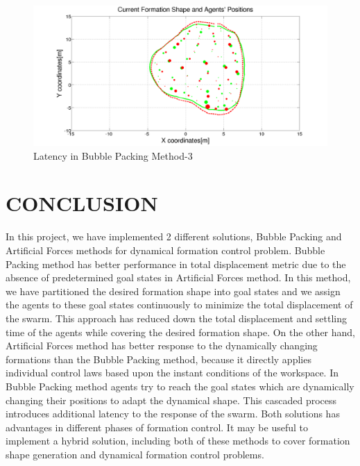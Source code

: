 \documentclass[letterpaper, 10 pt, conference]{ieeeconf}  %
\begin{document}
\begin{figure}[thpb]
\caption{Latency in Bubble Packing Method-3} \label{combo3_ref}
\centerline{\includegraphics[scale = 0.15]{combo3}}
\end{figure}

\section{CONCLUSION}
In this project, we have implemented 2 different solutions, Bubble Packing and Artificial Forces methods for dynamical formation control problem. Bubble Packing method has better performance in total displacement metric due to the absence of predetermined goal states in Artificial Forces method. In this method, we have partitioned the desired formation shape into goal states and we assign the agents to these goal states continuously to minimize the total displacement of the swarm. This approach has reduced down the total displacement and settling time of the agents while covering the desired formation shape.
On the other hand, Artificial Forces method has better response to the dynamically changing formations than the Bubble Packing method, because it directly applies individual control laws based upon the instant conditions of the workspace. In Bubble Packing method agents try to reach the goal states which are dynamically changing their positions to adapt the dynamical shape. This cascaded process introduces additional latency to the response of the swarm. Both solutions has advantages in different phases of formation control. It may be useful to implement a hybrid solution, including both of these methods to cover formation shape generation and dynamical formation control problems. 




%

\end{document}
